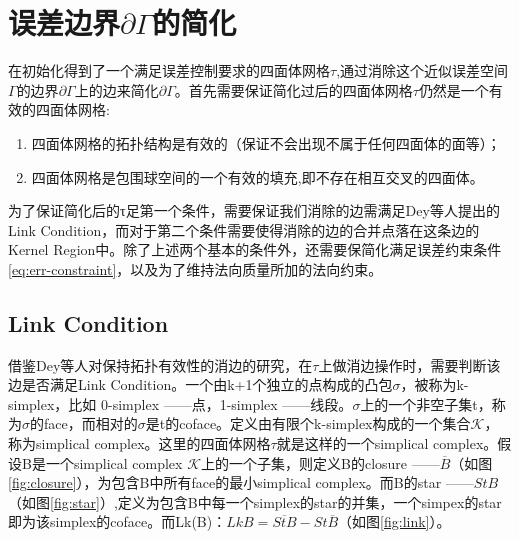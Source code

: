 \section{误差边界$\partial \Gamma$的简化}
在初始化得到了一个满足误差控制要求的四面体网格$\tau$,通过消除这个近似误差空间$\Gamma$的边界$\partial \Gamma$上的边来简化$\partial \Gamma$。首先需要保证简化过后的四面体网格$\tau$仍然是一个有效的四面体网格:
\begin{enumerate}[（1）]
  \item 四面体网格的拓扑结构是有效的（保证不会出现不属于任何四面体的面等）；
  \item 四面体网格是包围球空间的一个有效的填充,即不存在相互交叉的四面体。
\end{enumerate}
为了保证简化后的τ足第一个条件，需要保证我们消除的边需满足Dey等人提出的Link Condition\cite{link-cond}，而对于第二个条件需要使得消除的边的合并点落在这条边的Kernel Region中。除了上述两个基本的条件外，还需要保简化满足误差约束条件\eqref{eq:err-constraint}，以及为了维持法向质量所加的法向约束。

\subsection{Link Condition}
借鉴Dey等人对保持拓扑有效性的消边的研究\cite{link-cond}，在$\tau$上做消边操作时，需要判断该边是否满足Link Condition。一个由k+1个独立的点构成的凸包$\sigma$，被称为k-simplex，比如 0-simplex ——点，1-simplex ——线段。$\sigma$上的一个非空子集t，称为$\sigma$的face，而相对的$\sigma$是t的coface。定义由有限个k-simplex构成的一个集合$\mathcal{K}$，称为simplical complex。这里的四面体网格$\tau$就是这样的一个simplical complex。假设B是一个simplical complex $\mathcal{K}$上的一个子集，则定义B的closure ——$\overline{B}$（如图\ref{fig:closure}），为包含B中所有face的最小simplical complex。而B的star ——$St B$（如图\ref{fig:star}）,定义为包含B中每一个simplex的star的并集，一个simpex的star即为该simplex的coface。而Lk(B)：$Lk B = \overline{St B} - St \overline{B}$（如图\ref{fig:link}）。\par

